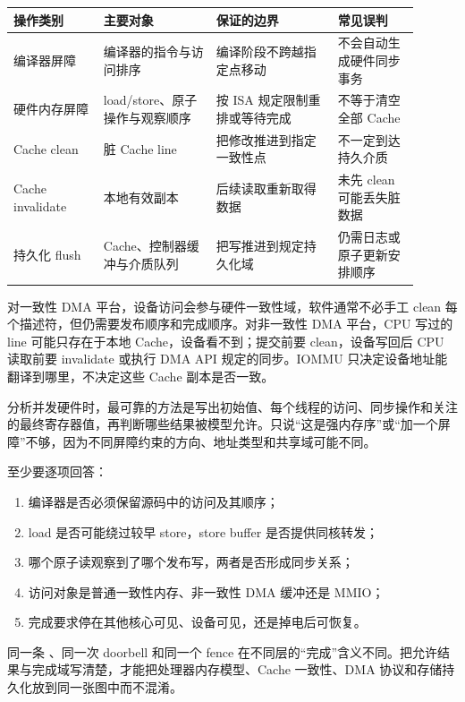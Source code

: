 \begin{longtable}{L{0.20\linewidth}L{0.25\linewidth}L{0.27\linewidth}L{0.18\linewidth}}
\toprule
操作类别 & 主要对象 & 保证的边界 & 常见误判 \\
\midrule
编译器屏障 & 编译器的指令与访问排序 & 编译阶段不跨越指定点移动 & 不会自动生成硬件同步事务 \\\tablerowrule
硬件内存屏障 & load/store、原子操作与观察顺序 & 按 ISA 规定限制重排或等待完成 & 不等于清空全部 Cache \\\tablerowrule
Cache clean & 脏 Cache line & 把修改推进到指定一致性点 & 不一定到达持久介质 \\\tablerowrule
Cache invalidate & 本地有效副本 & 后续读取重新取得数据 & 未先 clean 可能丢失脏数据 \\\tablerowrule
持久化 flush & Cache、控制器缓冲与介质队列 & 把写推进到规定持久化域 & 仍需日志或原子更新安排顺序 \\
\bottomrule
\end{longtable}

对一致性 DMA 平台，设备访问会参与硬件一致性域，软件通常不必手工 clean 每个描述符，但仍需要发布顺序和完成顺序。对非一致性 DMA 平台，CPU 写过的 line 可能只存在于本地 Cache，设备看不到；提交前要 clean，设备写回后 CPU 读取前要 invalidate 或执行 DMA API 规定的同步。IOMMU 只决定设备地址能翻译到哪里，不决定这些 Cache 副本是否一致。


分析并发硬件时，最可靠的方法是写出初始值、每个线程的访问、同步操作和关注的最终寄存器值，再判断哪些结果被模型允许。只说“这是强内存序”或“加一个屏障”不够，因为不同屏障约束的方向、地址类型和共享域可能不同。

至少要逐项回答：

\begin{enumerate}
  \item 编译器是否必须保留源码中的访问及其顺序；
  \item load 是否可能绕过较早 store，store buffer 是否提供同核转发；
  \item 哪个原子读观察到了哪个发布写，两者是否形成同步关系；
  \item 访问对象是普通一致性内存、非一致性 DMA 缓冲还是 MMIO；
  \item 完成要求停在其他核心可见、设备可见，还是掉电后可恢复。
\end{enumerate}

同一条 、同一次 doorbell 和同一个 fence 在不同层的“完成”含义不同。把允许结果与完成域写清楚，才能把处理器内存模型、Cache 一致性、DMA 协议和存储持久化放到同一张图中而不混淆。

